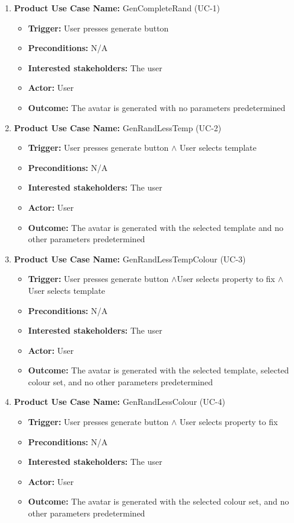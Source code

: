 \documentclass[12pt, titlepage]{article}
\begin{document}
\begin{enumerate}
\item{\textbf{Product Use Case Name:} GenCompleteRand (UC-1) }
\begin{itemize}
\item{\textbf{Trigger:} User presses generate button}
\item{\textbf{Preconditions:} N/A}
\item{\textbf{Interested stakeholders:} The user}
\item{\textbf{Actor:} User}
\item{\textbf{Outcome:} The avatar is generated with no parameters predetermined}
\end{itemize}
\item{\textbf{Product Use Case Name:}  GenRandLessTemp (UC-2)}
\begin{itemize}
\item{\textbf{Trigger:} User presses generate button $\land$ User selects template}
\item{\textbf{Preconditions:} N/A}
\item{\textbf{Interested stakeholders:} The user}
\item{\textbf{Actor:} User}
\item{\textbf{Outcome:} The avatar is generated with the selected template and no other parameters predetermined}
\end{itemize}
\item{\textbf{Product Use Case Name:} GenRandLessTempColour (UC-3)}
\begin{itemize}
\item{\textbf{Trigger:} User presses generate button  $\land$User selects property to fix  $\land$ User selects template}
\item{\textbf{Preconditions:} N/A}
\item{\textbf{Interested stakeholders:} The user}
\item{\textbf{Actor:} User}
\item{\textbf{Outcome:} The avatar is generated with the selected template, selected colour set, and no other parameters predetermined}
\end{itemize}
\item{\textbf{Product Use Case Name:} GenRandLessColour (UC-4) }
\begin{itemize}
\item{\textbf{Trigger:} User presses generate button $\land$ User selects property to fix}
\item{\textbf{Preconditions:} N/A}
\item{\textbf{Interested stakeholders:} The user}
\item{\textbf{Actor:} User}
\item{\textbf{Outcome:} The avatar is generated with the selected colour set, and no other parameters predetermined}
\end{itemize}
\end{enumerate}
\end{document}
